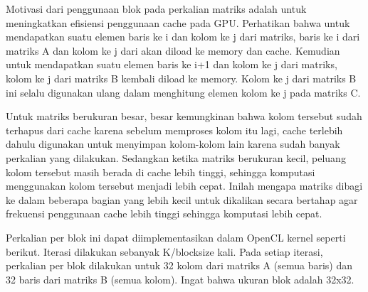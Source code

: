 Motivasi dari penggunaan blok pada perkalian matriks adalah untuk meningkatkan efisiensi penggunaan cache pada GPU. Perhatikan bahwa untuk mendapatkan suatu elemen baris ke i dan kolom ke j dari matriks, baris ke i dari matriks A dan kolom ke j dari akan diload ke memory dan cache. Kemudian untuk mendapatkan suatu elemen baris ke i+1 dan kolom ke j dari matriks, kolom ke j dari matriks B kembali diload ke memory. Kolom ke j dari matriks B ini selalu digunakan ulang dalam menghitung elemen kolom ke j pada matriks C.

Untuk matriks berukuran besar, besar kemungkinan bahwa kolom tersebut sudah terhapus dari cache karena sebelum memproses kolom itu lagi, cache terlebih dahulu digunakan untuk menyimpan kolom-kolom lain karena sudah banyak perkalian yang dilakukan. Sedangkan ketika matriks berukuran kecil, peluang kolom tersebut masih berada di cache lebih tinggi, sehingga komputasi menggunakan kolom tersebut menjadi lebih cepat. Inilah mengapa matriks dibagi ke dalam beberapa bagian yang lebih kecil untuk dikalikan secara bertahap agar frekuensi penggunaan cache lebih tinggi sehingga komputasi lebih cepat. 

Perkalian per blok ini dapat diimplementasikan dalam OpenCL kernel seperti berikut. Iterasi dilakukan sebanyak K/blocksize kali. Pada setiap iterasi, perkalian per blok dilakukan untuk 32 kolom dari matriks A (semua baris) dan 32 baris dari matriks B (semua kolom). Ingat bahwa ukuran blok adalah 32x32.

